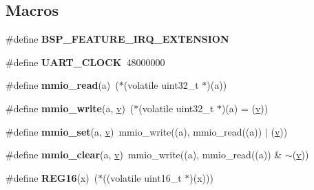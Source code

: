 \subsection*{Macros}
\begin{DoxyCompactItemize}
\item 
\mbox{\label{group__RTEMSBSPsARMBeagle_ga5d7d631d3a14b7554160f14eb42f351b}} 
\#define {\bfseries B\+S\+P\+\_\+\+F\+E\+A\+T\+U\+R\+E\+\_\+\+I\+R\+Q\+\_\+\+E\+X\+T\+E\+N\+S\+I\+ON}
\item 
\mbox{\label{group__RTEMSBSPsARMBeagle_ga37ba45746e4dd0d1fbf6320bd4c0ce25}} 
\#define {\bfseries U\+A\+R\+T\+\_\+\+C\+L\+O\+CK}~48000000
\item 
\mbox{\label{group__RTEMSBSPsARMBeagle_ga0b82d5b191d458881f68400a2531f5fb}} 
\#define {\bfseries mmio\+\_\+read}(a)~($\ast$(volatile uint32\+\_\+t $\ast$)(a))
\item 
\mbox{\label{group__RTEMSBSPsARMBeagle_ga7647f982c066a5ccd4e29e1d02dc3a0a}} 
\#define {\bfseries mmio\+\_\+write}(a,  \mbox{\hyperlink{sun4u_2tte_8h_a0b943bd7a9fc74d6635879a38dc16894}{v}})~($\ast$(volatile uint32\+\_\+t $\ast$)(a) = (\mbox{\hyperlink{sun4u_2tte_8h_a0b943bd7a9fc74d6635879a38dc16894}{v}}))
\item 
\mbox{\label{group__RTEMSBSPsARMBeagle_ga2c4769ccb19063b43a7d69654dad699d}} 
\#define {\bfseries mmio\+\_\+set}(a,  \mbox{\hyperlink{sun4u_2tte_8h_a0b943bd7a9fc74d6635879a38dc16894}{v}})~mmio\+\_\+write((a), mmio\+\_\+read((a)) $\vert$ (\mbox{\hyperlink{sun4u_2tte_8h_a0b943bd7a9fc74d6635879a38dc16894}{v}}))
\item 
\mbox{\label{group__RTEMSBSPsARMBeagle_gac2a8a6192abe3a8e3009c5b072b09068}} 
\#define {\bfseries mmio\+\_\+clear}(a,  \mbox{\hyperlink{sun4u_2tte_8h_a0b943bd7a9fc74d6635879a38dc16894}{v}})~mmio\+\_\+write((a), mmio\+\_\+read((a)) \& $\sim$(\mbox{\hyperlink{sun4u_2tte_8h_a0b943bd7a9fc74d6635879a38dc16894}{v}}))
\item 
\mbox{\label{group__RTEMSBSPsARMBeagle_ga3feca7ae3b8d39b3aefa023d047b01ac}} 
\#define {\bfseries R\+E\+G16}(x)~($\ast$((volatile uint16\+\_\+t $\ast$)(x)))

\end{DoxyCompactItemize}
